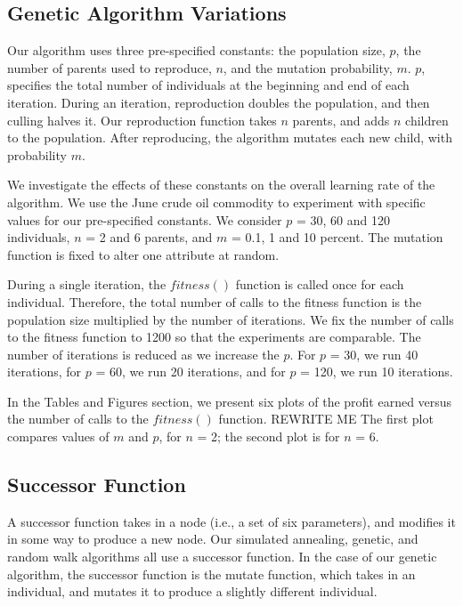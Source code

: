 \documentclass[12pt]{article}
\begin{document}
\subsection{Genetic Algorithm Variations}

Our algorithm uses three pre-specified constants: the population size, $p$, the
number of parents used to reproduce, $n$, and the mutation probability,
$m$. $p$, specifies the total number of individuals at the beginning and end of
each iteration. During an iteration, reproduction doubles the population, and
then culling halves it. Our reproduction function takes $n$ parents, and adds
$n$ children to the population. After reproducing, the algorithm mutates each
new child, with probability $m$.

We investigate the effects of these constants on the overall learning rate of
the algorithm. We use the June crude oil commodity to experiment with specific
values for our pre-specified constants. We consider $p$ = 30, 60 and 120
individuals, $n$ = 2 and 6 parents, and $m$ = 0.1, 1 and 10 percent.  The
mutation function is fixed to alter one attribute at random.

During a single iteration, the $fitness()$ function is called once for each
individual.  Therefore, the total number of calls to the fitness function is the
population size multiplied by the number of iterations.  We fix the number of
calls to the fitness function to 1200 so that the experiments are
comparable. The number of iterations is reduced as we increase the $p$. For $p$
= 30, we run 40 iterations, for $p$ = 60, we run 20 iterations, and for $p$ =
120, we run 10 iterations.

In the Tables and Figures section, we present six plots of the profit earned
versus the number of calls to the $fitness()$ function.  REWRITE ME The first
plot compares values of $m$ and $p$, for $n$ = 2; the second plot is for $n$ =
6.

\subsection{Successor Function}

A successor function takes in a node (i.e., a set of six parameters), and
modifies it in some way to produce a new node.  Our simulated annealing,
genetic, and random walk algorithms all use a successor function.  In the case
of our genetic algorithm, the successor function is the mutate function, which
takes in an individual, and mutates it to produce a slightly different
individual.
\end{document}
